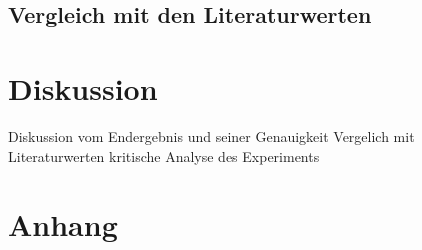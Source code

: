 \documentclass[12pt,a4paper,titlepage,headinclude,bibtotoc]{scrartcl}
\begin{document}
\subsection{Vergleich mit den Literaturwerten}



\section{Diskussion}
Diskussion vom Endergebnis und seiner Genauigkeit
Vergelich mit Literaturwerten
kritische Analyse des Experiments




\section{Anhang}
 
\end{document}
